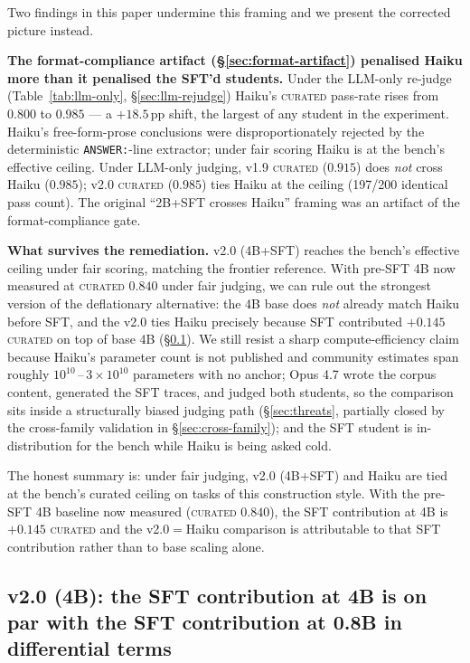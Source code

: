 \documentclass[10pt]{article}
\newcommand{\CU}{\textsc{curated}\xspace}
\begin{document}
Two findings in this paper undermine this framing and we present the corrected picture instead.

\textbf{The format-compliance artifact (\S\ref{sec:format-artifact}) penalised Haiku more than it penalised the SFT'd students.} Under the LLM-only re-judge (Table~\ref{tab:llm-only}, \S\ref{sec:llm-rejudge}) Haiku's \CU{} pass-rate rises from $0.800$ to $0.985$ --- a $+18.5$\,pp shift, the largest of any student in the experiment. Haiku's free-form-prose conclusions were disproportionately rejected by the deterministic \texttt{ANSWER:}-line extractor; under fair scoring Haiku is at the bench's effective ceiling. Under LLM-only judging, v1.9 \CU{} ($0.915$) does \emph{not} cross Haiku ($0.985$); v2.0 \CU{} ($0.985$) ties Haiku at the ceiling (197/200 identical pass count). The original ``2B+SFT crosses Haiku'' framing was an artifact of the format-compliance gate.

\textbf{What survives the remediation.} v2.0 (4B+SFT) reaches the bench's effective ceiling under fair scoring, matching the frontier reference. With pre-SFT 4B now measured at \CU{} $0.840$ under fair judging, we can rule out the strongest version of the deflationary alternative: the 4B base does \emph{not} already match Haiku before SFT, and the v2.0 ties Haiku precisely because SFT contributed $+0.145$ \CU{} on top of base 4B (\S\ref{sec:v20}). We still resist a sharp compute-efficiency claim because Haiku's parameter count is not published and community estimates span roughly $10^{10}$\,--\,$3{\times}10^{10}$ parameters with no anchor; Opus 4.7 wrote the corpus content, generated the SFT traces, and judged both students, so the comparison sits inside a structurally biased judging path (\S\ref{sec:threats}, partially closed by the cross-family validation in \S\ref{sec:cross-family}); and the SFT student is in-distribution for the bench while Haiku is being asked cold.

The honest summary is: under fair judging, v2.0 (4B+SFT) and Haiku are tied at the bench's curated ceiling on tasks of this construction style. With the pre-SFT 4B baseline now measured (\CU{} $0.840$), the SFT contribution at 4B is $+0.145$ \CU{} and the v2.0$=$Haiku comparison is attributable to that SFT contribution rather than to base scaling alone.

\subsection{v2.0 (4B): the SFT contribution at 4B is on par with the SFT contribution at 0.8B in differential terms}\label{sec:v20}
\end{document}
